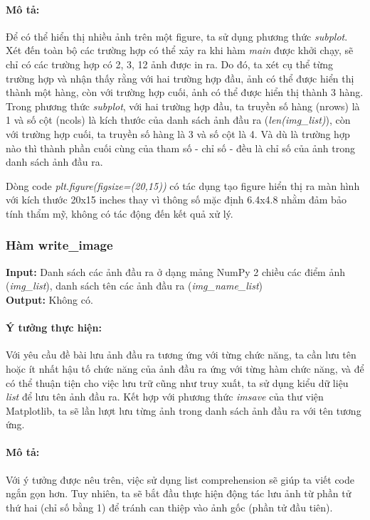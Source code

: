 \documentclass[]{article}
\begin{document}
\paragraph{Mô tả:} Để có thể hiển thị nhiều ảnh trên một figure, ta sử dụng phương thức \textit{subplot}. Xét đến toàn bộ các trường hợp có thể xảy ra khi hàm \textit{main} được khởi chạy, sẽ chỉ có các trường hợp có 2, 3, 12 ảnh được in ra. Do đó, ta xét cụ thể từng trường hợp và nhận thấy rằng với hai trường hợp đầu, ảnh có thể được hiển thị thành một hàng, còn với trường hợp cuối, ảnh có thể được hiển thị thành 3 hàng. Trong phương thức \textit{subplot}, với hai trường hợp đầu, ta truyền số hàng (nrows) là 1 và số cột (ncols) là kích thước của danh sách ảnh đầu ra (\textit{len(img\_list)}), còn với trường hợp cuối, ta truyền số hàng là 3 và số cột là 4. Và dù là trường hợp nào thì thành phần cuối cùng của tham số - chỉ số - đều là chỉ số của ảnh trong danh sách ảnh đầu ra. \par

Dòng code \textit{plt.figure(figsize=(20,15))} có tác dụng tạo figure hiển thị ra màn hình với kích thước 20x15 inches thay vì thông số mặc định 6.4x4.8 nhằm đảm bảo tính thẩm mỹ, không có tác động đến kết quả xử lý.

\subsubsection{Hàm write\_image}
\textbf{Input:} Danh sách các ảnh đầu ra ở dạng mảng NumPy 2 chiều các điểm ảnh (\textit{img\_list}), danh sách tên các ảnh đầu ra (\textit{img\_name\_list}) \\
\textbf{Output:} Không có.
\paragraph{Ý tưởng thực hiện:} Với yêu cầu đề bài lưu ảnh đầu ra tương ứng với từng chức năng, ta cần lưu tên hoặc ít nhất hậu tố chức năng của ảnh đầu ra ứng với từng hàm chức năng, và để có thể thuận tiện cho việc lưu trữ cũng như truy xuất, ta sử dụng kiểu dữ liệu \textit{list} để lưu tên ảnh đầu ra. Kết hợp với phương thức \textit{imsave} của thư viện Matplotlib, ta sẽ lần lượt lưu từng ảnh trong danh sách ảnh đầu ra với tên tương ứng.
\paragraph{Mô tả:} Với ý tưởng được nêu trên, việc sử dụng list comprehension sẽ giúp ta viết code ngắn gọn hơn. Tuy nhiên, ta sẽ bắt đầu thực hiện động tác lưu ảnh từ phần tử thứ hai (chỉ số bằng 1) để tránh can thiệp vào ảnh gốc (phần tử đầu tiên).
\end{document}
